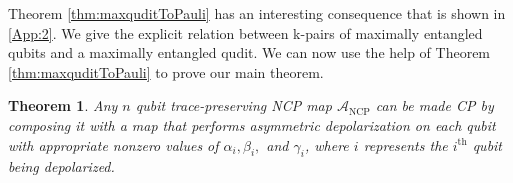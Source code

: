 \documentclass[12pt]{iopart}
\newtheorem{theorem}{Theorem}
\begin{document}
Theorem \ref{thm:maxquditToPauli} has an interesting consequence that is shown in \ref{App:2}. We give the explicit relation between k-pairs of maximally entangled qubits and a maximally entangled qudit. We can now use the help of Theorem \ref{thm:maxquditToPauli} to prove our main theorem.
\begin{theorem}\label{thm:NCP_to_CP}
Any $n$ qubit trace-preserving NCP map $\mathcal{A}_\text{NCP}$ can be made CP by composing it with a map that performs asymmetric depolarization on each qubit with appropriate nonzero values of $\alpha_i, \beta_i,$ and $\gamma_i$, where $i$ represents the $i^\text{th}$ qubit being depolarized. 
\end{theorem}
\end{document}

